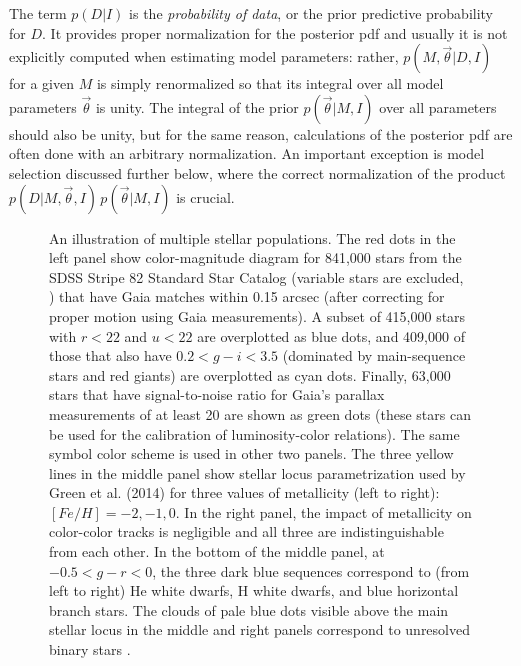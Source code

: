 The term $p(D|I)$ is the {\it probability of data}, or the prior predictive probability for $D$. 
It provides proper normalization for the posterior  pdf and usually it is not explicitly computed
when estimating model parameters: rather, $p(M,\vec{\theta}|D,I)$ for a given $M$
is simply renormalized so that
its integral over all model parameters $\vec{\theta}$ is unity. The integral of the prior $p(\vec{\theta}|M,I)$
over all parameters should also be unity, but for the same reason, calculations of the posterior pdf are
often done with an arbitrary normalization. An important exception is model selection discussed further
below, where the correct normalization of the product $p(D|M,\vec{\theta},I) \, p(\vec{\theta}|M,I)$ is crucial.



\begin{figure}[t!]
\caption{An illustration of multiple stellar populations. The red dots in the left panel show color-magnitude diagram for 841,000 stars from the SDSS Stripe 82 Standard Star Catalog
(variable stars are excluded, \citealt{2021MNRAS.505.5941T}) that have Gaia matches within 0.15 arcsec (after correcting for proper motion using Gaia measurements). A subset of 415,000 stars with $r < 22$ and $u<22$ are overplotted as blue dots, and 409,000 of those that also have $0.2 < g-i < 3.5$ (dominated by main-sequence stars and red giants) are overplotted as cyan dots. Finally, 63,000 stars that have signal-to-noise ratio for Gaia’s parallax measurements of at least 20 are shown as green dots (these stars can be used for the calibration of luminosity-color relations). The same symbol color scheme is used in other two panels. The three yellow lines in the middle panel show stellar locus parametrization used by Green et al. (2014) for three values of metallicity (left to right): $[Fe/H] = -2, -1, 0$. In the right panel, the impact of metallicity on color-color tracks is negligible and all three are indistinguishable from each other. In the bottom of the middle panel, at $-0.5 < g-r < 0$, the three dark blue sequences correspond to (from left to right) He white dwarfs, H white dwarfs, and blue horizontal branch stars. The clouds of pale blue dots visible above the main stellar locus in the middle and right panels correspond to unresolved binary stars \citep{2004ApJ...615L.141S}.} \label{fig:3dataDiags}
\end{figure}



